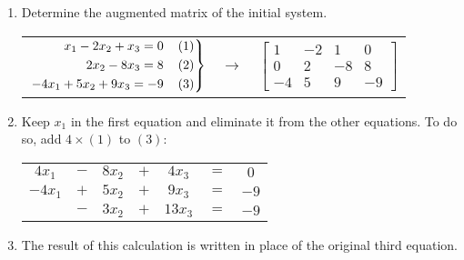 \documentclass{article}
\newenvironment{rcases}
  {\left.\begin{aligned}}
  {\end{aligned}\right\rbrace}
\begin{document}
\begin{enumerate}

    \item Determine the augmented matrix of the initial system. 
    \begin{center}
        \begin{tabular}{c c c}

            $\begin{rcases}
            x_1 - 2x_2 + x_3 = 0 \hspace{4mm} (1) \\  
            2x_2 - 8x_3 = 8 \hspace{4mm} (2) \\
            -4x_1 + 5x_2 + 9x_3 = -9 \hspace{4mm} (3) \\ 
            \end{rcases}$

            & $\rightarrow$ &

            $\begin{bmatrix}
                1 & -2 & 1 & 0 \\
                0 & 2 & -8 & 8 \\
                -4 & 5 & 9 & -9
            \end{bmatrix}$

        \end{tabular}
    \end{center}

    \item Keep $x_1$ in the first equation and eliminate it from the other equations. To do so, add $4 \times (1)$ to $(3)$:\\
    \begin{center}
        \begin{tabular}{c c c c c c c}
            $4x_1$ & $-$ & $8x_2$ & $+$ & $4x_3$ & $=$ & $0$ \\
            $-4x_1$ & $+$ & $5x_2$ & $+$ & $9x_3$ & $=$ & $-9$ \\
            \hline
            & $-$ & $3x_2$ & $+$ & $13x_3$ & $=$ & $-9$ \\
        \end{tabular}
    \end{center}

    \item The result of this calculation is written in place of the original third equation.
    \begin{center}
        \begin{tabular}{c c c}


\end{tabular}
\end{center}
\end{enumerate}
\end{document}
